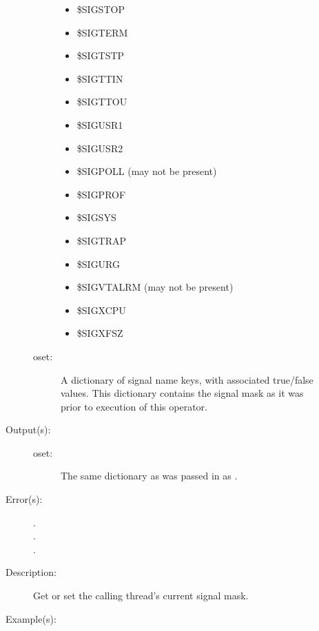 \begin{description}
\begin{description}
\begin{description}
\begin{itemize}
			\item{\$SIGSTOP}
			\item{\$SIGTERM}
			\item{\$SIGTSTP}
			\item{\$SIGTTIN}
			\item{\$SIGTTOU}
			\item{\$SIGUSR1}
			\item{\$SIGUSR2}
			\item{\$SIGPOLL (may not be present)}
			\item{\$SIGPROF}
			\item{\$SIGSYS}
			\item{\$SIGTRAP}
			\item{\$SIGURG}
			\item{\$SIGVTALRM (may not be present)}
			\item{\$SIGXCPU}
			\item{\$SIGXFSZ}
			\end{itemize}
		\item[oset: ]
			A dictionary of signal name keys, with associated
			true/false values.  This dictionary contains the signal
			mask as it was prior to execution of this operator.
		\end{description}
	\item[Output(s): ]
		\begin{description}\item[]
		\item[oset: ]
			The same dictionary as was passed in as .
		\end{description}
	\item[Error(s): ]
		\begin{description}\item[]
		\item[.]
		\item[.]
		\item[.]
		\end{description}
	\item[Description: ]
		Get or set the calling thread's current signal mask.
	\item[Example(s): ]\begin{verbatim}


\end{verbatim}
\end{description}
\end{description}
